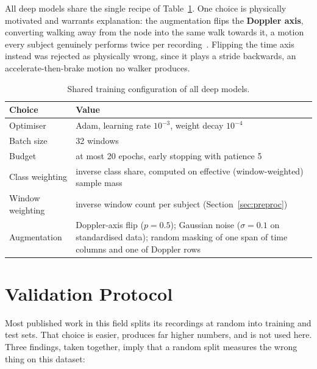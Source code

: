 All deep models share the single recipe of Table~\ref{tab:trainconfig}. One
choice is physically motivated and warrants explanation: the augmentation flips
the \textbf{Doppler axis}, converting walking away from the node into the
same walk towards it, a motion every subject genuinely performs twice per
recording~\cite{fard2026}. Flipping the time axis instead was rejected as
physically wrong, since it plays a stride backwards, an
accelerate-then-brake motion no walker produces.

\begin{table}[H]
  \centering
  \caption[Shared training configuration of all deep models]{Shared training configuration of all deep models.}
  \label{tab:trainconfig}
  \small
  \begin{tabular}{@{}lp{8.6cm}@{}}
    \toprule
    Choice & Value \\
    \midrule
    Optimiser & Adam, learning rate $10^{-3}$, weight decay $10^{-4}$ \\
    Batch size & 32 windows \\
    Budget & at most 20 epochs, early stopping with patience 5 \\
    Class weighting & inverse class share, computed on effective
      (window-weighted) sample mass \\
    Window weighting & inverse window count per subject
      (Section~\ref{sec:preproc}) \\
    Augmentation & Doppler-axis flip ($p=0.5$); Gaussian noise
      ($\sigma = 0.1$ on standardised data); random masking of one span of
      time columns and one of Doppler rows \\
    \bottomrule
  \end{tabular}
\end{table}

\section{Validation Protocol}
\label{sec:validation}

Most published work in this field splits its recordings at random into
training and test sets. That choice is easier, produces far higher numbers,
and is not used here. Three findings, taken together, imply that a random
split measures the wrong thing on this dataset:


